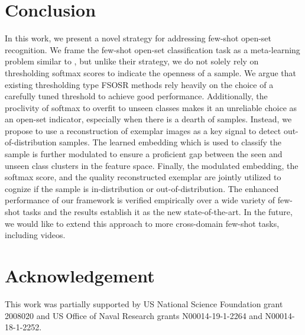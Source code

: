 \section{Conclusion}
In this work, we present a novel strategy for addressing few-shot open-set recognition. We frame the few-shot open-set classification task as a meta-learning problem similar to \cite{peeler}, but unlike their strategy, we do not solely rely on thresholding softmax scores to indicate the openness of a sample. We argue that existing thresholding type FSOSR methods \cite{peeler,snatcher} rely heavily on the choice of a carefully tuned threshold to achieve good performance. Additionally, the proclivity of softmax to overfit to unseen classes makes it an unreliable choice as an open-set indicator, especially when there is a dearth of samples. Instead, we propose to use a reconstruction of exemplar images as a key signal to detect out-of-distribution samples. 
The learned embedding which is used to classify the sample is further modulated to ensure a proficient gap between the seen and unseen class clusters in the feature space. Finally, the modulated embedding, the softmax score, and the quality reconstructed exemplar are jointly utilized to cognize if the sample is in-distribution or out-of-distribution. 
The enhanced performance of our framework is verified empirically over a wide variety of few-shot tasks and the results establish it as the new state-of-the-art. In the future, we would like to extend this approach to more cross-domain few-shot tasks, including videos.
\vspace{-2em}
\section{Acknowledgement}
This work was partially supported by US National Science Foundation grant 2008020 and US Office of Naval Research grants N00014-19-1-2264 and N00014-18-1-2252.
\vspace{-1em}